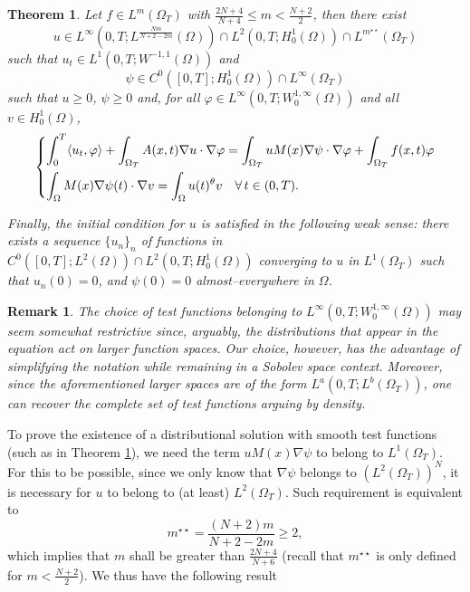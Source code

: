 \documentclass{amsart}
\numberwithin{equation}{section}
\newtheorem{remark}[example]{Remark}
\newtheorem{theo}[example]{Theorem}
\def\elle#1{L^{#1}}
\def\elleom#1{L^{#1}(\Omega)}
\def\elleomT#1{L^{#1}(\Omega_T)}
\def\Sobom#1{W^{1,#1}_0(\Omega)}
\def\Hom{H^1_0(\Omega)}
\def\io{\int_\Omega}
\def\ioT{\int_{\Omega_T}}
\begin{document}
\begin{theo}\label{Main_Theorem_2}
    Let $f\in\elle m(\Omega_T)$ with $\frac{2N+4}{N+4}\leq m <\frac{N+2}{2}$, then there exist 
    $$u\in\elle\infty(0,T;\elleom{\frac{Nm}{N+2-2m}})\cap\elle2(0,T;\Hom)\cap \elleomT {m^{\star\star}}$$ 
    such that $u_t\in\elle1(0,T;W^{-1,1}(\Omega))$ 
    and $$\psi\in C^0([0,T];\Hom)\cap\elle\infty(\Omega_T)$$ such that $u\geq0$, $\psi\geq0$ and, for all $\varphi\in\elle\infty(0,T;\Sobom \infty)$ and all $v\in\Hom$,
    \begin{equation}\label{DefSol_parabell_theo2}
        \begin{dcases}
                \int_0^T \langle u_t,\varphi\rangle+\ioT A(x,t)\nabla u\cdot \nabla \varphi = \ioT uM(x)\nabla \psi\cdot\nabla\varphi + \ioT f(x,t)\varphi\\
                \io M(x)\nabla \psi(t)\cdot\nabla v = \io u(t)^\theta v\quad\forall\,t\in(0,T).
        \end{dcases}
    \end{equation}
    
    Finally, the initial condition for $u$ is satisfied in the following weak sense: there exists a sequence $\{u_n\}_n$ of functions in $C^0([0, T] ; L^2(\Omega)) \cap L^2(0, T ;\Hom)$ converging to $u$ in $\elleomT1$ such that $u_n(0)=0$, and $\psi(0)=0$ almost--everywhere in $\Omega$.
\end{theo}
\begin{remark}
    The choice of test functions belonging to $\elle\infty(0,T;\Sobom \infty)$ may seem somewhat restrictive since, arguably, the distributions that appear in the equation act on larger function spaces. Our choice, however, has the advantage of simplifying the notation while remaining in a Sobolev space context. Moreover, since the aforementioned larger spaces are of the form $\elle a(0,T;\elleomT b)$, one can recover the complete set of test functions arguing by density. 
\end{remark}
To prove the existence of a distributional solution with smooth test functions (such as in Theorem \ref{Main_Theorem_2}), we need the term $uM(x)\nabla\psi$ to belong to $\elleomT1$. For this to be possible, since we only know that $\nabla\psi$ belongs to $\left(\elleomT2\right)^N$, it is necessary for $u$ to belong to (at least) $\elleomT2$. Such requirement is equivalent to
$$m^{\star\star}=\frac{(N+2)m}{N+2-2m}\geq2,$$
which implies that $m$ shall be greater than $\frac{2N+4}{N+6}$ (recall that $m^{\star\star}$ is only defined for $m<\frac{N+2}{2}$). We thus have the following result
\end{document}
